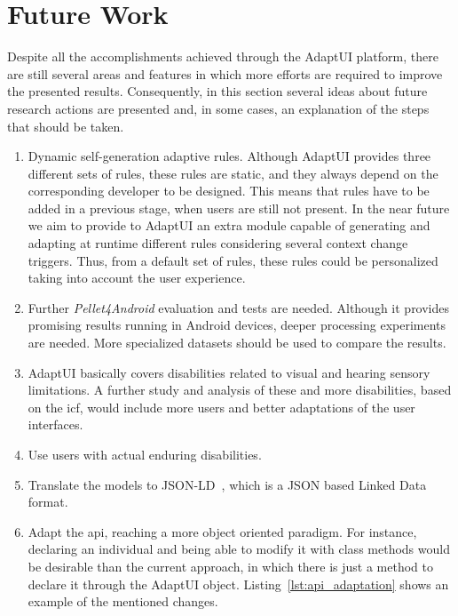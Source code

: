 \section{Future Work}
\label{sec:future_work}

Despite all the accomplishments achieved through the AdaptUI platform, there are 
still several areas and features in which more efforts are required to improve 
the presented results. Consequently, in this section several ideas about future
research actions are presented and, in some cases, an explanation of the steps 
that should be taken.

\begin{enumerate}[label=\alph*)]
  \item Dynamic self-generation adaptive rules. Although AdaptUI provides three 
  different sets of rules, these rules are static, and they always depend on 
  the corresponding developer to be designed. This means that rules have to 
  be added in a previous stage, when users are still not present. In the near 
  future we aim to provide to AdaptUI an extra module capable of generating and 
  adapting at runtime different rules considering several context change 
  triggers. Thus, from a default set of rules, these rules could be personalized 
  taking into account the user experience.
  
  \item Further \textit{Pellet4Android} evaluation and tests are needed. Although
  it provides promising results running in Android devices, deeper processing
  experiments are needed. More specialized datasets should be used to compare
  the results.
  
  \item AdaptUI basically covers disabilities related to visual and hearing
  sensory limitations. A further study and analysis of these and more 
  disabilities, based on the \ac{icf}, would include more users and better 
  adaptations of the user interfaces.
  
  \item Use users with actual enduring disabilities.
  
  \item Translate the models to JSON-LD~\citep{jsonld}, which is a JSON based
  Linked Data format.
  
  \item Adapt the \ac{api}, reaching a more object oriented paradigm. For instance,
  declaring an individual and being able to modify it with class methods would 
  be desirable than the current approach, in which there is just a method to
  declare it through the AdaptUI object. Listing~\ref{lst:api_adaptation} shows
  an example of the mentioned changes.
  

\end{enumerate}
